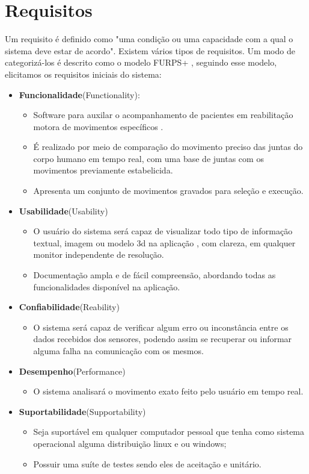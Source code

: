 \section {Requisitos}
\label{Sec:Requisitos}
  Um requisito é definido como "uma condição ou uma capacidade com a qual o 
sistema deve estar de acordo"\cite{requisitos}. Existem vários tipos de 
requisitos. Um modo de categorizá-los é descrito como o modelo 
FURPS+\cite{robertGrady} , seguindo esse modelo, elicitamos os requisitos 
iniciais do sistema: 
  \begin{itemize}
  \item \textbf{Funcionalidade}(Functionality):
    \begin{itemize}
    \item Software para auxilar o acompanhamento de pacientes em reabilitação 
    motora de movimentos específicos .
    \item É realizado por meio de comparação do movimento preciso das juntas do
     corpo humano em tempo real, com uma base de juntas com os movimentos 
    previamente estabelicida.
    \item Apresenta um conjunto de movimentos gravados para seleção e execução.
    \end{itemize}
  \item \textbf{Usabilidade}(Usability)
    \begin{itemize}
    \item O usuário do sistema será capaz de visualizar todo tipo de informação
     textual, imagem ou modelo 3d na aplicação , com clareza, em qualquer 
    monitor independente de resolução.
    \item Documentação ampla e de fácil compreensão, abordando todas as 
    funcionalidades disponível na aplicação.
    \end{itemize}
\item \textbf{Confiabilidade}(Reability)
    \begin{itemize}
    \item O sistema será capaz de verificar algum erro ou inconstância entre os
     dados recebidos dos sensores, podendo assim se recuperar ou informar 
    alguma falha na comunicação com os mesmos.
    \end{itemize}
\item \textbf{Desempenho}(Performance)
    \begin{itemize}
    \item O sistema analisará o movimento exato feito pelo usuário em tempo real.
    \end{itemize}
\item \textbf{Suportabilidade}(Supportability)
    \begin{itemize}
    \item Seja suportável em qualquer computador pessoal que tenha como sistema
     operacional alguma distribuição linux e ou windows;
    \item Possuir uma suíte de testes sendo eles de aceitação e unitário.
    \end{itemize}
  \end{itemize}

